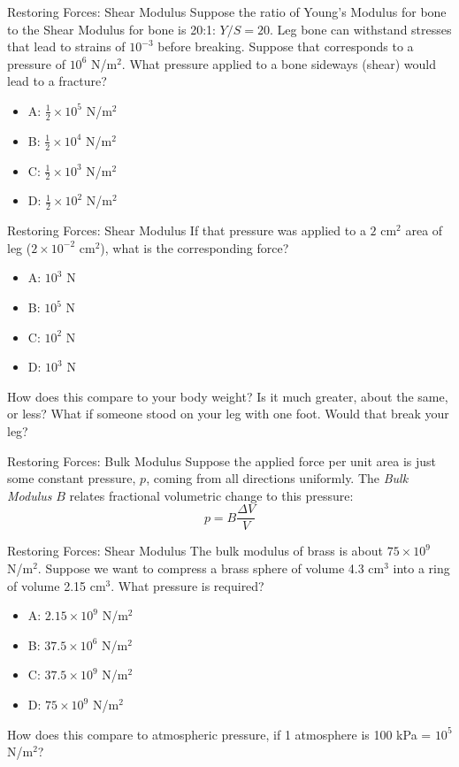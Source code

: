 \documentclass{beamer}
\begin{document}
\begin{frame}{Restoring Forces: Shear Modulus}
Suppose the ratio of Young's Modulus for bone to the Shear Modulus for bone is 20:1: $Y/S = 20$.  Leg bone can withstand stresses that lead to strains of $10^{-3}$ before breaking.  Suppose that corresponds to a pressure of $10^6$ N/m$^2$.  What pressure applied to a bone sideways (shear) would lead to a fracture?
\begin{itemize}
\item A: $\frac{1}{2} \times 10^{5}$ N/m$^2$
\item B: $\frac{1}{2} \times 10^{4}$ N/m$^2$
\item C: $\frac{1}{2} \times 10^{3}$ N/m$^2$
\item D: $\frac{1}{2} \times 10^{2}$ N/m$^2$
\end{itemize}
\end{frame}

\begin{frame}{Restoring Forces: Shear Modulus}
If that pressure was applied to a $2$ cm$^2$ area of leg ($2 \times 10^{-2}$ cm$^2$), what is the corresponding force?
\begin{itemize}
\item A: $10^{3}$ N
\item B: $10^{5}$ N
\item C: $10^{2}$ N
\item D: $10^{3}$ N
\end{itemize}
How does this compare to your body weight? Is it much greater, about the same, or less?  What if someone stood on your leg with one foot.  Would that break your leg?
\end{frame}

\begin{frame}{Restoring Forces: Bulk Modulus}
Suppose the applied force per unit area is just some constant pressure, $p$, coming from all directions uniformly.  The \textit{Bulk Modulus} $B$ relates fractional volumetric change to this pressure: \\
\begin{equation}
p = B\frac{\Delta V}{V}
\end{equation}
\end{frame}

\begin{frame}{Restoring Forces: Shear Modulus}
The bulk modulus of brass is about $75 \times 10^{9}$ N/m$^2$.  Suppose we want to compress a brass sphere of volume 4.3 cm$^3$ into a ring of volume 2.15 cm$^3$.  What pressure is required?
\begin{itemize}
\item A: $2.15 \times 10^{9}$ N/m$^2$ 
\item B: $37.5 \times 10^{6}$ N/m$^2$ 
\item C: $37.5 \times 10^{9}$ N/m$^2$ 
\item D: $75 \times 10^{9}$ N/m$^2$ 
\end{itemize}
How does this compare to atmospheric pressure, if 1 atmosphere is 100 kPa = $10^5$ N/m$^2$?
\end{frame}
\end{document}
